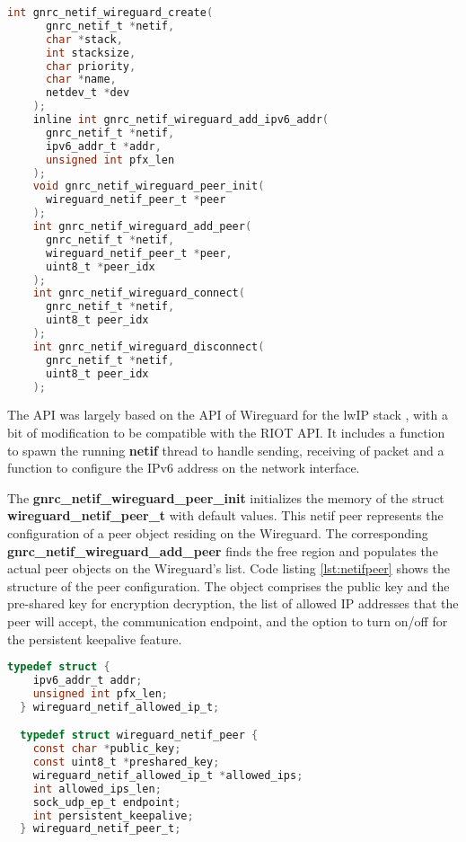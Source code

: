   \begin{lstlisting}[caption = Wireguard netif API,language=C, label={lst:netifapi}]
    int gnrc_netif_wireguard_create(
      gnrc_netif_t *netif, 
      char *stack, 
      int stacksize,
      char priority, 
      char *name,
      netdev_t *dev
    );
    inline int gnrc_netif_wireguard_add_ipv6_addr(
      gnrc_netif_t *netif,
      ipv6_addr_t *addr,
      unsigned int pfx_len
    );
    void gnrc_netif_wireguard_peer_init(
      wireguard_netif_peer_t *peer
    );
    int gnrc_netif_wireguard_add_peer(
      gnrc_netif_t *netif,
      wireguard_netif_peer_t *peer,
      uint8_t *peer_idx
    );
    int gnrc_netif_wireguard_connect(
      gnrc_netif_t *netif, 
      uint8_t peer_idx
    );
    int gnrc_netif_wireguard_disconnect(
      gnrc_netif_t *netif, 
      uint8_t peer_idx
    );
  \end{lstlisting}

  The API was largely based on the API of Wireguard for the lwIP stack \cite{lwip}, with
  a bit of modification to be compatible with the RIOT API. It includes a function to 
  spawn the running \textbf{netif} thread to handle sending, receiving 
  of packet and a function to configure the IPv6 address on the network interface. 

  The \textbf{gnrc{\_}netif{\_}wireguard{\_}peer{\_}init} initializes the  memory of the struct
  \textbf{wireguard{\_}netif{\_}peer{\_}t} with default values. This netif peer represents
  the configuration of a peer object residing on the Wireguard. The corresponding
  \textbf{gnrc{\_}netif{\_}wireguard{\_}add{\_}peer} finds the free region and populates 
  the actual peer objects on the Wireguard's list. Code listing \ref{lst:netifpeer} shows
  the structure of the peer configuration. The object comprises the public key and 
  the pre-shared key for encryption decryption, the list of allowed IP addresses that the peer will
  accept, the communication endpoint, and the option to turn on/off for the persistent keepalive
  feature.

  \begin{lstlisting}[caption = netif peer configuration,language=C, label={lst:netifpeer}]
  typedef struct {
    ipv6_addr_t addr;
    unsigned int pfx_len;
  } wireguard_netif_allowed_ip_t;

  typedef struct wireguard_netif_peer {
    const char *public_key;
    const uint8_t *preshared_key;
    wireguard_netif_allowed_ip_t *allowed_ips;
    int allowed_ips_len;
    sock_udp_ep_t endpoint;
    int persistent_keepalive;
  } wireguard_netif_peer_t;
  \end{lstlisting}

